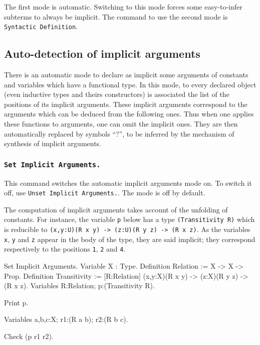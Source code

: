 {\begin{coq_example}
The first mode is automatic. Switching to this mode forces some
easy-to-infer subterms to always be implicit.
The command to use the second mode is  {\tt Syntactic
Definition}.

\subsection{Auto-detection of implicit arguments}
\label{Auto-implicit}

There is an automatic mode to declare as implicit some arguments of
constants and variables which have a functional type. In this mode,
to every declared object (even inductive types and theirs constructors) is
associated the list of the positions of its implicit arguments. These
implicit arguments correspond to the arguments which can be deduced
from the following ones. Thus when one applies these functions to
arguments, one can omit the implicit ones. They are then automatically
replaced by symbols ``?'', to be inferred by the mechanism of
synthesis of implicit arguments.

\subsubsection{\tt Set Implicit Arguments.}
\label{Implicit Arguments}

This command switches the automatic implicit arguments
mode on. To switch it off, use {\tt Unset Implicit Arguments.}.
The mode is off by default.

The computation of implicit arguments takes account of the
unfolding of constants.  For instance, the variable {\tt p} below has
a type {\tt (Transitivity R)} which is reducible to {\tt (x,y:U)(R x
y) -> (z:U)(R y z) -> (R x z)}. As the variables {\tt x}, {\tt y} and
{\tt z} appear in the body of the type, they are said implicit; they
correspond respectively to the positions {\tt 1}, {\tt 2} and {\tt 4}.

\begin{coq_example*}
Set Implicit Arguments.
Variable X : Type.
Definition Relation := X -> X -> Prop.
Definition Transitivity := [R:Relation]
           (x,y:X)(R x y) -> (z:X)(R y z) -> (R x z).
Variables R:Relation; p:(Transitivity R).
\end{coq_example*}
\begin{coq_example}
Print p.
\end{coq_example}
\begin{coq_example*}
Variables a,b,c:X;  r1:(R a b); r2:(R b c).
\end{coq_example*}
\begin{coq_example}
Check (p r1 r2).
\end{coq_example}


\end{coq_example}}

